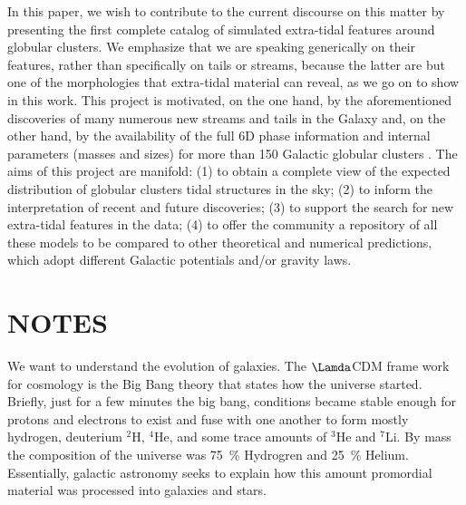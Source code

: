 In this paper, we wish to contribute to the current discourse on this matter by presenting the first complete catalog of simulated extra-tidal features around globular clusters. We emphasize that we are speaking generically on their features, rather than specifically on tails or streams, because the latter are but one of the morphologies that extra-tidal material can reveal, as we go on to show in this work. This project is motivated, on the one hand, by the aforementioned discoveries of many numerous new streams and  tails in the Galaxy and, on the other hand, by the availability of the full 6D phase information and internal parameters (masses and sizes) for more than 150 Galactic globular clusters \citep{2018MNRAS.478.1520B, 2021MNRAS.505.5957B, 2021MNRAS.501.2279V}. The aims of this project are manifold: (1) to obtain a complete view of the expected distribution of globular clusters tidal structures in the sky; (2) to inform the interpretation of recent and future discoveries; (3) to support the search for new extra-tidal features in the data; (4) to offer the community a repository of all these models to be compared to other theoretical and numerical predictions, which adopt different Galactic potentials and/or gravity laws.    



\section{NOTES}
    We want to understand the evolution of galaxies. The $\Lamda$CDM frame work for cosmology is the Big Bang theory that states how the universe started. Briefly, just for a few minutes the big bang, conditions became stable enough for protons and electrons to exist and fuse with one another to form mostly hydrogen, deuterium $^2$H, $^4$He, and some trace amounts of $^3$He and $^7$Li. By mass the composition of the universe was 75~\% Hydrogren and 25~\% Helium. Essentially, galactic astronomy seeks to explain how this amount promordial material was processed into galaxies and stars. 
